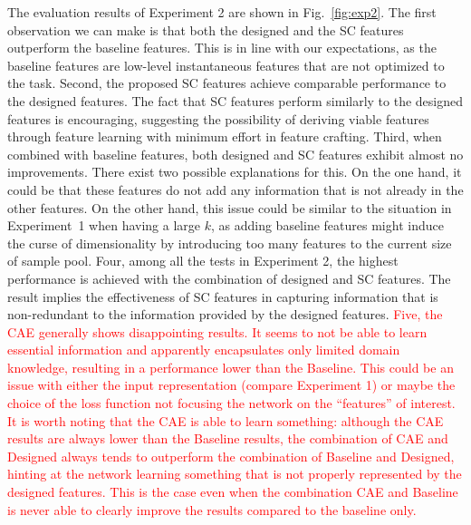 \documentclass{ws-ijsc}
\newcommand{\highlight}[1]{\textcolor{red}{#1}}
\begin{document}

The evaluation results of Experiment 2 are shown in Fig.~\ref{fig:exp2}. The first observation we can make is that both the designed and the SC features outperform the baseline features. This is in line with our expectations, as the baseline features are low-level instantaneous features that are not optimized to the task.  %
Second, the proposed SC features achieve comparable performance to the designed features. The fact that SC features perform similarly to the designed features is encouraging, suggesting the possibility of deriving viable features through feature learning with minimum effort in feature crafting. 
Third, when combined with baseline features, both designed and SC features exhibit almost no improvements. There exist two possible explanations for this. On the one hand, it could be that these features do not add any information that is not already in the other features. On the other hand, this issue could be similar to the situation in Experiment~1 when having a large $k$, as adding baseline features might induce the curse of dimensionality by introducing too many features to the current size of sample pool. %
Four, among all the tests in Experiment 2, the highest performance is achieved with the combination of designed and SC features. The result implies the effectiveness of SC features in capturing information that is non-redundant to the information provided by the designed features.
\highlight{Five, the CAE generally shows disappointing results. It seems to not be able to learn essential information and apparently encapsulates only limited domain knowledge, resulting in a performance lower than the Baseline. This could be an issue with either the input representation (compare Experiment 1) or maybe the choice of the loss function not focusing the network on the ``features'' of interest. It is worth noting that the CAE is able to learn something: although the CAE results are always lower than the Baseline results, the combination of CAE and Designed always tends to outperform the combination of Baseline and Designed, hinting at the network learning something that is not properly represented by the designed features. This is the case even when the combination CAE and Baseline is never able to clearly improve the results compared to the baseline only.}
\end{document}
